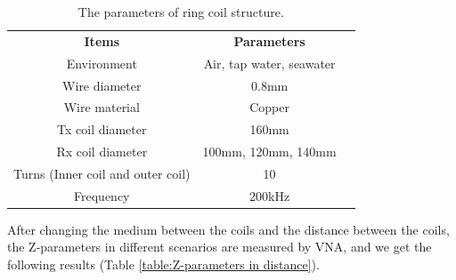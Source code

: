 \begin{table}[htbp]
    \centering
    \caption{The parameters of ring coil structure.}
    \begin{tabular}{ c|cc }
        \thickhline
        \textbf{Items}                    & \textbf{Parameters}      \\
        \thickhline
        Environment                       & Air, tap water, seawater \\ \hline
        Wire diameter                     & 0.8mm                    \\ \hline
        Wire material                     & Copper                   \\
        \hline
        Tx coil diameter                  & 160mm                    \\ \hline
        Rx coil diameter                  & 100mm, 120mm, 140mm      \\ \hline
        Turns (Inner coil and outer coil) & 10                       \\ \hline
        Frequency                         & 200kHz                   \\ \hline
    \end{tabular}
    \label{table:ring coil parameters - different distance}
\end{table}

After changing the medium between the coils and the distance between the coils, the Z-parameters in different scenarios are measured by VNA, and we get the following results (Table \ref{table:Z-parameters in distance}).

\newcommand\Tstrut{\rule{0pt}{2.3em}}         %
\newcommand\Bstrut{\rule[-1.8em]{0pt}{0pt}}   %

